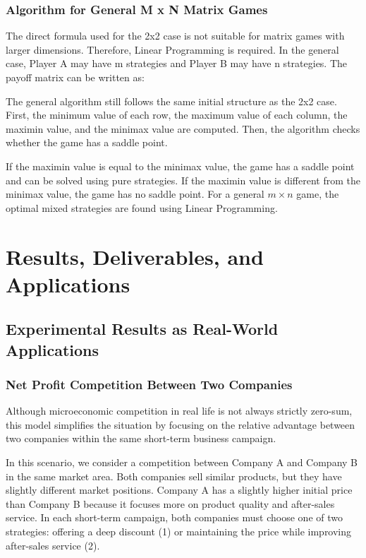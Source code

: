 \documentclass[12pt,a4paper]{article}
\begin{document}
\noindent{}


\subsubsection{Algorithm for General M x N Matrix Games}

The direct formula used for the 2x2 case is not suitable for matrix games with larger dimensions. Therefore, Linear Programming is required. In the general case, Player A may have m strategies and Player B may have n strategies. The payoff matrix can be written as:

\noindent{}

The general algorithm still follows the same initial structure as the 2x2 case. First, the minimum value of each row, the maximum value of each column, the maximin value, and the minimax value are computed. Then, the algorithm checks whether the game has a saddle point.

If the maximin value is equal to the minimax value, the game has a saddle point and can be solved using pure strategies. If the maximin value is different from the minimax value, the game has no saddle point. For a general \(m \times n\) game, the optimal mixed strategies are found using Linear Programming.

\section{Results, Deliverables, and Applications}
\subsection{Experimental Results as Real-World Applications}

\subsubsection{Net Profit Competition Between Two Companies}

Although microeconomic competition in real life is not always strictly zero-sum, this model simplifies the situation by focusing on the relative advantage between two companies within the same short-term business campaign.

In this scenario, we consider a competition between Company A and Company B in the same market area. Both companies sell similar products, but they have slightly different market positions. Company A has a slightly higher initial price than Company B because it focuses more on product quality and after-sales service. In each short-term campaign, both companies must choose one of two strategies: offering a deep discount (1) or maintaining the price while improving after-sales service (2).
\end{document}
